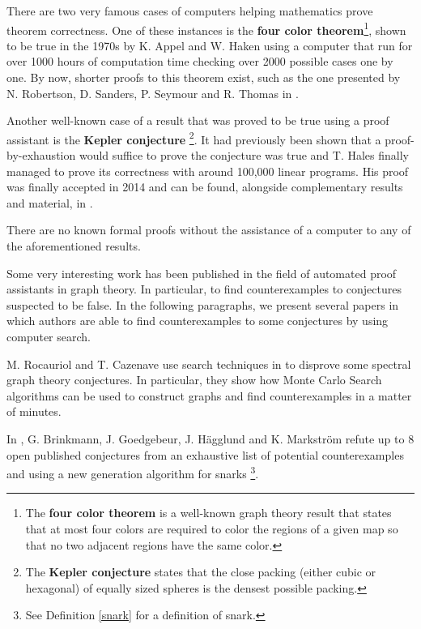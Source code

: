 \documentclass[11pt]{article}
\theoremstyle{definition}
\begin{document}
There are two very famous cases of computers helping mathematics prove theorem correctness. One of these instances is the \textbf{four color theorem}\footnote{The \textbf{four color theorem} is a well-known graph theory result that states that at most four colors are required to color the regions of a given map so that no two adjacent regions have the same color.}, shown to be true in the 1970s by K. Appel and W. Haken \cite{AppelHaken:1, AppelHaken:2, AppelHaken:book} using a computer that run for over 1000 hours of computation time checking over 2000 possible cases one by one. By now, shorter proofs to this theorem exist, such as the one presented by N. Robertson, D. Sanders, P. Seymour and R. Thomas in \cite{RobertsonSandersSeymourThomas}.

Another well-known case of a result that was proved to be true using a proof assistant is the \textbf{Kepler conjecture} \footnote{The \textbf{Kepler conjecture} states that the close packing (either cubic or hexagonal) of equally sized spheres is the densest possible packing.}. It had previously been shown that a proof-by-exhaustion would suffice to prove the conjecture was true and T. Hales finally managed to prove its correctness with around 100,000 linear programs. His proof was finally accepted in 2014 and can be found, alongside complementary results and material, in \cite{HalesFerguson}.

There are no known formal proofs without the assistance of a computer to any of the aforementioned results.

Some very interesting work has been published in the field of automated proof assistants in graph theory. In particular, to find counterexamples to conjectures suspected to be false. In the following paragraphs, we present several papers in which authors are able to find counterexamples to some conjectures by using computer search.

M. Rocauriol and T. Cazenave use search techniques in \cite{RoucairolCazenave:2022} to disprove some spectral graph theory conjectures. In particular, they show how Monte Carlo Search algorithms can be used to construct graphs and find counterexamples in a matter of minutes.

In \cite{BrinkmannGunnarGoedgebeurHagglund}, G. Brinkmann, J. Goedgebeur, J. Hägglund and K. Markström refute up to 8 open published conjectures from an exhaustive list of potential counterexamples and using a new generation algorithm for snarks \footnote{See Definition \ref{snark} for a definition of snark.}.
\end{document}
